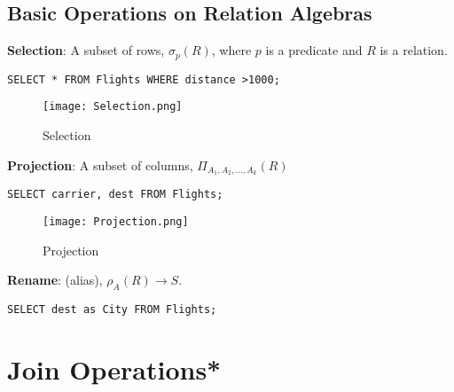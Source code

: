 \documentclass{article}
\begin{document}
  
  
 
 \subsection*{Basic Operations on Relation Algebras}
  
  \begin{outline}
        \1 \textbf{Selection}: A subset of rows, $\sigma_p(R)$, where $p$ is a predicate and $R$ is a relation.  
  
    \begin{lstlisting}[frame=single] 
    SELECT * FROM Flights WHERE distance >1000; 
 \end{lstlisting} 
  
  
  

 \begin{figure}[h!] %
    \centering
    \texttt{[image: Selection.png]} 
    \caption{Selection}
    \label{fig:selection}
 \end{figure}


  
  
  \1 \textbf{Projection}: A subset of columns, $\Pi_{A_1, A_2, \dots, A_k}(R)$
  
   \begin{lstlisting}[frame=single] 
    SELECT carrier, dest FROM Flights; 
 \end{lstlisting} 
  
  
  

 \begin{figure}[h!] %
    \centering
    \texttt{[image: Projection.png]} 
    \caption{Projection}
    \label{fig:projection}
 \end{figure}


  
  
  \1 \textbf{Rename}: (alias), $\rho_A(R) \to S$.
  
  
   \begin{lstlisting}[frame=single] 
    SELECT dest as City FROM Flights; 
 \end{lstlisting} 
  
  
  \end{outline}
  
  
  
 
 
 \section*{Join Operations*}
 
\end{document}
